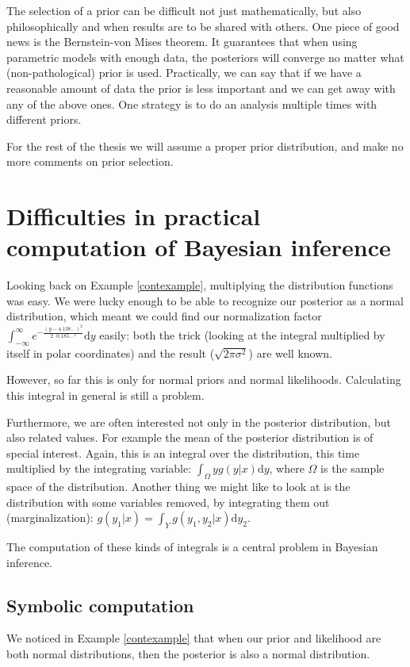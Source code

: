\documentclass[12pt,vu]{adammath}
\theoremstyle{plain}
\theoremstyle{definition}
\theoremstyle{remark}
\begin{document}
The selection of a prior can be difficult not just mathematically, but also philosophically and when results are to be shared with others.
One piece of good news is the Bernstein-von Mises theorem.
It guarantees that when using parametric models with enough data, the posteriors will converge no matter what (non-pathological) prior is used.
Practically, we can say that if we have a reasonable amount of data the prior is less important and we can get away with any of the above ones.
One strategy is to do an analysis multiple times with different priors.

For the rest of the thesis we will assume a proper prior distribution, and make no more comments on prior selection.

\chapter{Difficulties in practical computation of Bayesian inference}\label{bayescomp}
Looking back on Example \ref{contexample}, multiplying the distribution functions was easy.
We were lucky enough to be able to recognize our posterior as a normal distribution,
which meant we could find our normalization factor $\int_{-\infty}^{\infty} e^{-\frac{(y - 4.138...)^2}{2 \cdot 0.185...^2}} \mathrm{d}y$ easily:
both the trick (looking at the integral multiplied by itself in polar coordinates) and the result ($\sqrt{2\pi\sigma^2}$) are well known.

However, so far this is only for normal priors and normal likelihoods.
Calculating this integral in general is still a problem.

Furthermore, we are often interested not only in the posterior distribution, but also related values.
For example the mean of the posterior distribution is of special interest.
Again, this is an integral over the distribution, this time multiplied by the integrating variable:
$\int_\Omega y g(y | x) \mathrm{d} y$, where $\Omega$ is the sample space of the distribution.
Another thing we might like to look at is the distribution with some variables removed, by integrating them out (marginalization):
$g(y_1 | x) = \int_Y g(y_1, y_2 | x) \mathrm{d} y_2$.

The computation of these kinds of integrals is a central problem in Bayesian inference.

\section{Symbolic computation}
We noticed in Example \ref{contexample} that when our prior and likelihood are both normal distributions, then the posterior is also a normal distribution.
\end{document}
